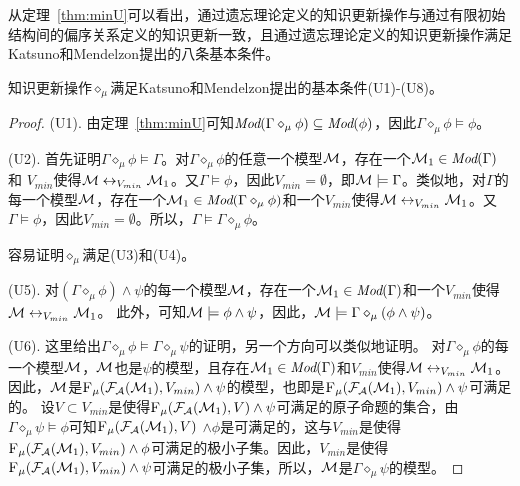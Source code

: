 从定理~\ref{thm:minU}可以看出，通过遗忘理论定义的知识更新操作与通过有限初始结构间的偏序关系定义的知识更新一致，且通过遗忘理论定义的知识更新操作满足Katsuno和Mendelzon提出的八条基本条件。

\begin{theorem}\label{thm:U1toU8}
	知识更新操作$\diamond_{\mu}$满足Katsuno和Mendelzon提出的基本条件(U1)-(U8)。
\end{theorem}
\begin{proof}
	(U1). 由定理~\ref{thm:minU}可知$\textit{Mod}(\Gamma \diamond_{\mu} \phi) \subseteq \textit{Mod}(\phi)$，因此$\Gamma \diamond_{\mu} \phi \models \phi$。
	
	 
	
	(U2). 首先证明$\Gamma \diamond_{\mu} \phi \models \Gamma$。对$\Gamma \diamond_{\mu} \phi$的任意一个模型${\cal M}$，存在一个${\cal M}_1 \in \textit{Mod}(\Gamma)$ 和 $V_{min}$使得${\cal M} \leftrightarrow_{V_{min}} {\cal M}_1$。又$\Gamma \models \phi$，因此$V_{min} = \emptyset$，即${\cal M} \models  \Gamma$。类似地，对$\Gamma$的每一个模型${\cal M}$，存在一个${\cal M}_1\in \textit{Mod}(\Gamma \diamond_{\mu} \phi)$和一个$V_{min}$使得${\cal M} \leftrightarrow_{V_{min}} {\cal M}_1$。又$\Gamma \models \phi$，因此$V_{min} = \emptyset$。所以，$\Gamma \models \Gamma \diamond_{\mu} \phi$。
	
	 
	
	容易证明$\diamond_{\mu}$满足(U3)和(U4)。
	
	(U5). 对$(\Gamma \diamond_{\mu} \phi) \wedge \psi$的每一个模型${\cal M}$，存在一个${\cal M}_1 \in \textit{Mod}(\Gamma)$和一个$V_{min}$使得${\cal M} \leftrightarrow_{V_{min}} {\cal M}_1$。
	此外，可知${\cal M} \models \phi \wedge \psi$，因此，${\cal M} \models \Gamma \diamond_{\mu} (\phi \wedge \psi)$。
	 
	(U6). 这里给出$\Gamma \diamond_{\mu} \phi \models \Gamma \diamond_{\mu} \psi$的证明，另一个方向可以类似地证明。
	对$\Gamma \diamond_{\mu} \phi$的每一个模型${\cal M}$，${\cal M}$也是$\psi$的模型，且存在${\cal M}_1 \in \textit{Mod}(\Gamma)$和$V_{min}$使得${\cal M} \leftrightarrow_{V_{min}} {\cal M}_1$。
	因此，${\cal M}$是${\textsc{F}_{\textsc{$\mu$}}}({\cal F}_{{\cal A}}({\cal M}_1), V_{min}) \wedge \psi$的模型，也即是${\textsc{F}_{\textsc{$\mu$}}}({\cal F}_{{\cal A}}({\cal M}_1), V_{min}) \wedge \psi$可满足的。
	设$V\subset V_{min}$是使得${\textsc{F}_{\textsc{$\mu$}}}({\cal F}_{{\cal A}}({\cal M}_1), V) \wedge \psi$可满足的原子命题的集合，由$\Gamma \diamond_{\mu} \psi \models \phi$可知${\textsc{F}_{\textsc{$\mu$}}}({\cal F}_{{\cal A}}({\cal M}_1), V)$ $\wedge \phi$是可满足的，这与$V_{min}$是使得${\textsc{F}_{\textsc{$\mu$}}}({\cal F}_{{\cal A}}({\cal M}_1), V_{min}) \wedge \phi$可满足的极小子集。因此，$V_{min}$是使得${\textsc{F}_{\textsc{$\mu$}}}({\cal F}_{{\cal A}}({\cal M}_1), V_{min}) \wedge \psi$可满足的极小子集，所以，${\cal M}$是$\Gamma \diamond_{\mu} \psi$的模型。
	

\end{proof}
